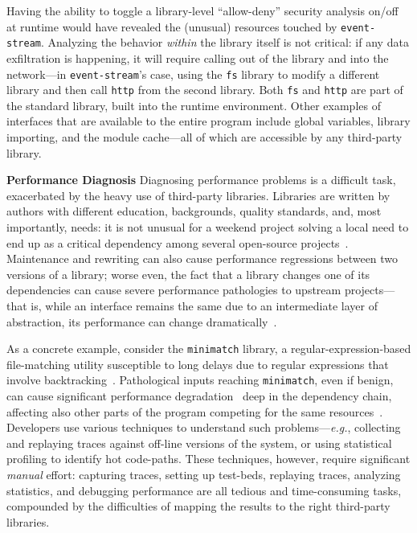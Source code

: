 \documentclass[letterpaper,twocolumn,10pt]{article}
\def\eg{{\em e.g.}, }
\newcommand{\heading}[1]{\vspace{2pt}\noindent\textbf{#1}\enspace}
\newcommand{\ttt}[1]{\texttt{#1}}
\begin{document}
Having the ability to toggle a library-level ``allow-deny'' security analysis on/off at runtime would have revealed the (unusual) resources touched by \ttt{event-stream}.
Analyzing the behavior \emph{within} the library itself is not critical:
  if any data exfiltration is happening, it will require calling out of the library and into the network---in \ttt{event-stream}'s case, using the \ttt{fs} library to modify a different library and then call \ttt{http} from the second library.
Both \ttt{fs} and \ttt{http} are part of the standard library, built into the runtime environment.
Other examples of interfaces that are available to the entire program include global variables, library importing, and the module cache---all of which are accessible by any third-party library.

\heading{Performance Diagnosis}
Diagnosing performance problems is a difficult task, exacerbated by the heavy use of third-party libraries.
Libraries are written by authors with different education, backgrounds, quality standards, and, most importantly, needs:
  it is not unusual for a weekend project solving a local need to end up as a critical dependency among several open-source projects~\cite{cheapcomplexity}.
Maintenance and rewriting can also cause performance regressions between two versions of a library;
  worse even, the fact that a library changes one of its dependencies can cause severe performance pathologies to upstream projects---that is, while an interface remains the same due to an intermediate layer of abstraction, its performance can change dramatically~\cite{jest}.

As a concrete example, consider the \ttt{minimatch} library, a regular-expression-based file-matching utility susceptible to long delays due to regular expressions that involve backtracking~\cite{minimatch}.
Pathological inputs reaching \ttt{minimatch}, even if benign, can cause significant performance degradation~\cite{redos} deep in the dependency chain, affecting also other parts of the program competing for the same resources~\cite{evp}.
Developers use various techniques to understand such problems---\eg collecting and replaying traces against off-line versions of the system, or using statistical profiling to identify hot code-paths.
These techniques, however, require significant \emph{manual} effort:
  capturing traces, setting up test-beds, replaying traces, analyzing statistics, and debugging performance are all tedious and time-consuming tasks, compounded by the difficulties of mapping the results to the right third-party libraries.
\end{document}

